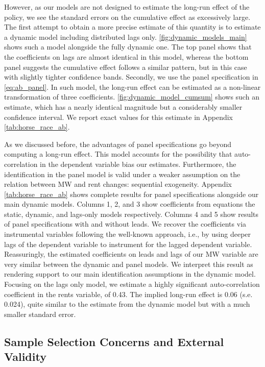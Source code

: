 However, as our models are not designed to estimate the long-run effect of the policy, we see the
standard errors on the cumulative effect as excessively large. The first attempt to obtain a more
precise estimate of this quantity is to estimate a dynamic model including distributed lags only.
\autoref{fig:dynamic_models_main} shows such a model alongside the fully dynamic one. The top panel 
shows that the coefficients on lags are almost identical in this model, whereas the bottom panel 
suggests the cumulative effect follows a similar pattern, but in this case with slightly tighter 
confidence bands. Secondly, we use the panel specification in \autoref{eq:ab_panel}. In such model, 
the long-run effect can be estimated as a non-linear transformation of three coefficients. 
\autoref{fig:dynamic_model_cumsum} shows such an estimate, which has a nearly identical magnitude 
but a considerably smaller confidence interval. We report exact values for this estimate in Appendix 
\autoref{tab:horse_race_ab}.

As we discussed before, the advantages of panel specifications go beyond computing a long-run 
effect. This model accounts for the possibility that auto-correlation in the dependent variable 
bias our estimates. Furthermore, the identification in the panel model is valid under a weaker 
assumption on the relation between MW and rent changes: sequential exogeneity. Appendix 
\autoref{tab:horse_race_ab} shows complete results for panel specifications alongside our main 
dynamic models. Columns 1, 2, and 3 show coefficients from equations the static, dynamic, and 
lags-only models respectively. Columns 4 and 5 show results of panel specifications with and 
without leads. We recover the coefficients via instrumental variables following the well-known 
\textcite{ArellanoBond1991} approach, i.e., by using deeper lags of the dependent variable to 
instrument for the lagged dependent variable. Reassuringly, the estimated coefficients on leads 
and lags of our MW variable are very similar between the dynamic and panel models. We interpret 
this result as rendering support to our main identification assumptions in the dynamic model. 
Focusing on the lags only model, we estimate a highly significant auto-correlation coefficient 
in the rents variable, of 0.43. The implied long-run effect is 0.06 (s.e. 0.024), quite similar
to the estimate from the dynamic model but with a much smaller standard error.


\subsection{Sample Selection Concerns and External Validity}\label{sec:sample_rest}

